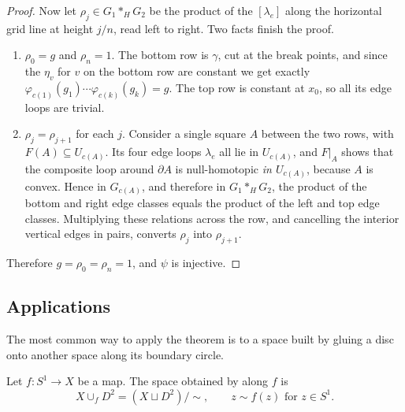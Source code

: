 \begin{proof}
	Now let $\rho_j \in G_1*_HG_2$ be the product of the $[\lambda_e]$ along the horizontal grid line at height $j/n$, read left to right. Two facts finish the proof.
	\begin{enumerate}
		\item $\rho_0 = g$ and $\rho_n = 1$. The bottom row is $\gamma$, cut at the break points, and since the $\eta_v$ for $v$ on the bottom row are constant we get exactly $\varphi_{c(1)}(g_1)\cdots\varphi_{c(k)}(g_k) = g$. The top row is constant at $x_0$, so all its edge loops are trivial.
		\item $\rho_j = \rho_{j+1}$ for each $j$. Consider a single square $A$ between the two rows, with $F(A) \subseteq U_{c(A)}$. Its four edge loops $\lambda_e$ all lie in $U_{c(A)}$, and $F|_A$ shows that the composite loop around $\partial A$ is null-homotopic \emph{in $U_{c(A)}$}, because $A$ is convex. Hence in $G_{c(A)}$, and therefore in $G_1 *_H G_2$, the product of the bottom and right edge classes equals the product of the left and top edge classes. Multiplying these relations across the row, and cancelling the interior vertical edges in pairs, converts $\rho_j$ into $\rho_{j+1}$.
	\end{enumerate}
	Therefore $g = \rho_0 = \rho_n = 1$, and $\psi$ is injective.
\end{proof}

\begin{center}
\end{center}

\subsection{Applications}

The most common way to apply the theorem is to a space built by gluing a disc onto
another space along its boundary circle.

\begin{definition}
	Let $f: S^1 \to X$ be a map. The space obtained by  along $f$ is
	$$
	X \cup_f D^2 = (X \sqcup D^2)/\!\sim, \qquad z \sim f(z) \text{ for } z \in S^1 .
	$$
\end{definition}


